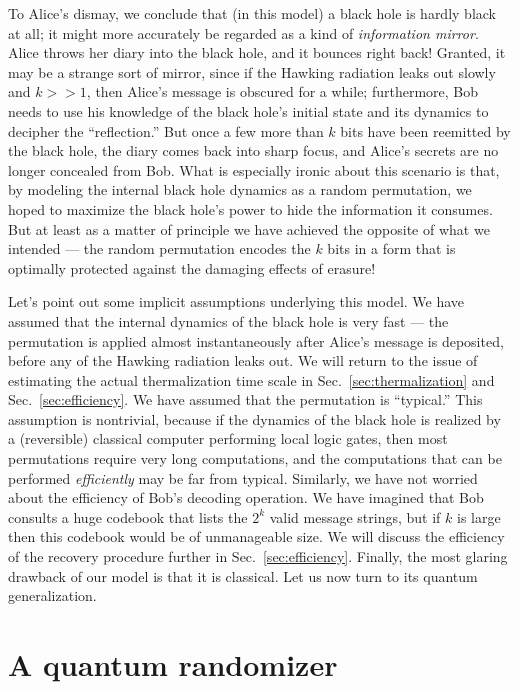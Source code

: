 \documentclass[11pt]{article}
\begin{document}
To Alice's dismay, we conclude that (in this model) a black hole is hardly black at all; it might more accurately be regarded as a kind of {\em information mirror}. Alice throws her diary into the black hole, and it bounces right back! Granted, it may be a strange sort of mirror, since if the Hawking radiation leaks out slowly and $k >> 1$, then Alice's message is obscured for a while; furthermore, Bob needs to use his knowledge of the black hole's initial state and its dynamics to decipher the ``reflection.'' But once a few more than $k$ bits have been reemitted by the black hole, the diary comes back into sharp focus, and Alice's secrets are no longer concealed from Bob. What is especially ironic about this scenario is that, by modeling the internal black hole dynamics as a random permutation, we hoped to maximize the black hole's power to hide the information it consumes. But at least as a matter of principle we have achieved the opposite of what we intended ---  the random permutation encodes the $k$ bits in a form that is optimally protected against the damaging effects of erasure! 

Let's point out some implicit assumptions underlying this model. We have assumed that the internal dynamics of the black hole is very fast --- the permutation is applied almost instantaneously after Alice's message is deposited, before any of the Hawking radiation leaks out. We will return to the issue of estimating the actual thermalization time scale in Sec.~\ref{sec:thermalization} and Sec.~\ref{sec:efficiency}. We have assumed that the permutation is ``typical.'' This assumption is nontrivial, because if the dynamics of the black hole is realized by a (reversible) classical computer performing local logic gates, then most permutations require very long computations, and the computations that can be performed {\em efficiently} may be far from typical. Similarly, we have not worried about the efficiency of Bob's decoding operation. We have imagined that Bob consults a huge codebook that lists the $2^k$ valid message strings, but if $k$ is large then this codebook would be of unmanageable size. We will discuss the efficiency of the recovery procedure further in Sec.~\ref{sec:efficiency}. Finally, the most glaring drawback of our model is that it is classical. Let us now turn to its quantum generalization. 


\section{A quantum randomizer}
\label{sec:quantum}
\end{document}
